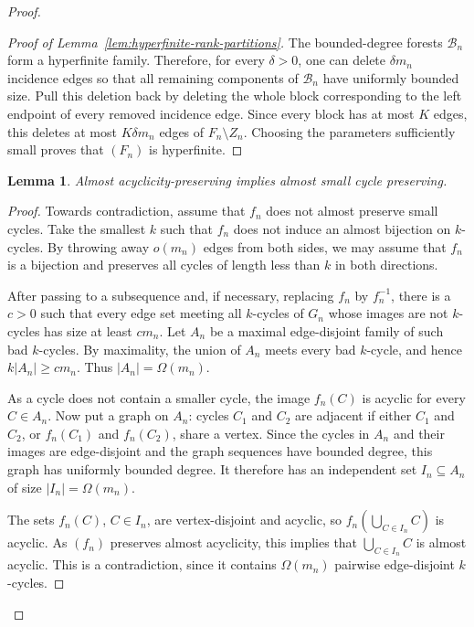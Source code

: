 \documentclass{article}
\theoremstyle{plain}
\newtheorem{lem}[thm]{Lemma}
\theoremstyle{definition}
\newcommand{\cB}{\mathcal{B}}
\begin{document}
\begin{proof}
\begin{proof}[Proof of Lemma~\ref{lem:hyperfinite-rank-partitions}]
The bounded-degree forests $\cB_n$ form a hyperfinite family. Therefore, for every $\delta>0$, one can delete $\delta m_n$ incidence edges so that all remaining components of $\cB_n$ have uniformly bounded size. Pull this deletion back by deleting the whole block corresponding to the left endpoint of every removed incidence edge. Since every block has at most $K$ edges, this deletes at most $K\delta m_n$ edges of $F_n\setminus Z_n$. Choosing the parameters sufficiently small proves that $(F_n)$ is hyperfinite. 
\end{proof}

\begin{lem}\label{lem:almost_acyclic_preserves_small_cycles}
Almost acyclicity-preserving implies almost small cycle preserving.    
\end{lem}
\begin{proof}

Towards contradiction, assume that $f_n$ does not almost preserve small cycles. Take the smallest $k$ such that $f_n$ does not induce an almost bijection on $k$-cycles. By throwing away $o(m_n)$ edges from both sides, we may assume that $f_n$ is a bijection and preserves all cycles of length less than $k$ in both directions.

After passing to a subsequence and, if necessary, replacing $f_n$ by $f_n^{-1}$, there is a $c>0$ such that every edge set meeting all $k$-cycles of $G_n$ whose images are not $k$-cycles has size at least $cm_n$. Let $A_n$ be a maximal edge-disjoint family of such bad $k$-cycles. By maximality, the union of $A_n$ meets every bad $k$-cycle, and hence $k|A_n|\geq cm_n$. Thus $|A_n|=\Omega(m_n)$.

As a cycle does not contain a smaller cycle, the image $f_n(C)$ is acyclic for every $C\in A_n$. Now put a graph on $A_n$: cycles $C_1$ and $C_2$ are adjacent if either $C_1$ and $C_2$, or $f_n(C_1)$ and $f_n(C_2)$, share a vertex. Since the cycles in $A_n$ and their images are edge-disjoint and the graph sequences have bounded degree, this graph has uniformly bounded degree. It therefore has an independent set $I_n\subseteq A_n$ of size $|I_n|=\Omega(m_n)$.

The sets $f_n(C)$, $C\in I_n$, are vertex-disjoint and acyclic, so $f_n\left(\bigcup_{C\in I_n}C\right)$ is acyclic. As $(f_n)$ preserves almost acyclicity, this implies that
$\bigcup_{C\in I_n}C$ is almost acyclic. This is a contradiction, since it contains $\Omega(m_n)$ pairwise edge-disjoint $k$-cycles.
\end{proof}


\end{proof}
\end{document}
